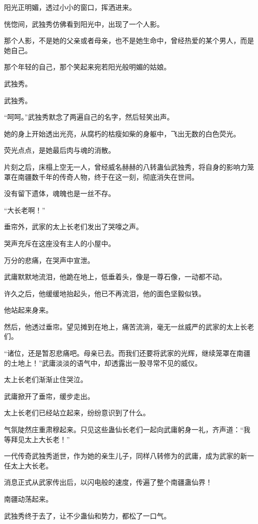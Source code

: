 \begin{this_body}
阳光正明媚，透过小小的窗口，挥洒进来。

恍惚间，武独秀仿佛看到阳光中，出现了一个人影。

那个人影，不是她的父亲或者母亲，也不是她生命中，曾经热爱的某个男人，而是她自己。

那个年轻的自己，那个笑起来宛若阳光般明媚的姑娘。

武独秀。

武独秀。

“呵呵。”武独秀默念了两遍自己的名字，然后轻笑出声。

她的身上开始透出光亮，从腐朽的枯瘦如柴的身躯中，飞出无数的白色荧光。

荧光点点，是她最后肉与魂的消散。

片刻之后，床榻上空无一人，曾经威名赫赫的八转蛊仙武独秀，将自身的影响力笼罩在南疆数千年的传奇人物，终于在这一刻，彻底消失在世间。

没有留下遗体，魂魄也是一丝不存。

“大长老啊！”

垂帘外，武家的太上长老们发出了哭嚎之声。

哭声充斥在这座没有主人的小屋中。

万分的悲痛，在哭声中宣泄。

武庸默默地流泪，他跪在地上，低垂着头，像是一尊石像，一动都不动。

许久之后，他缓缓地抬起头，他已不再流泪，他的面色坚毅似铁。

他站起来身来。

然后，他透过垂帘。望见摊到在地上，痛苦流淌，毫无一丝威严的武家的太上长老们。

“诸位，还是暂忍悲痛吧。母亲已去。而我们还要将武家的光辉，继续笼罩在南疆的土地上！”武庸淡淡的语气中，却透露出一股寻常不见的威仪。

太上长老们渐渐止住哭泣。

武庸掀开了垂帘，缓步走出。

太上长老们已经站立起来，纷纷意识到了什么。

气氛陡然庄重肃穆起来。只见这些蛊仙长老们一起向武庸躬身一礼，齐声道：“我等拜见太上大长老！”

一代传奇武独秀逝世，作为她的亲生儿子，同样八转修为的武庸，成为武家的新一任太上大长老。

消息正式从武家传出后，以闪电般的速度，传遍了整个南疆蛊仙界！

南疆动荡起来。

武独秀终于去了，让不少蛊仙和势力，都松了一口气。


\end{this_body}
